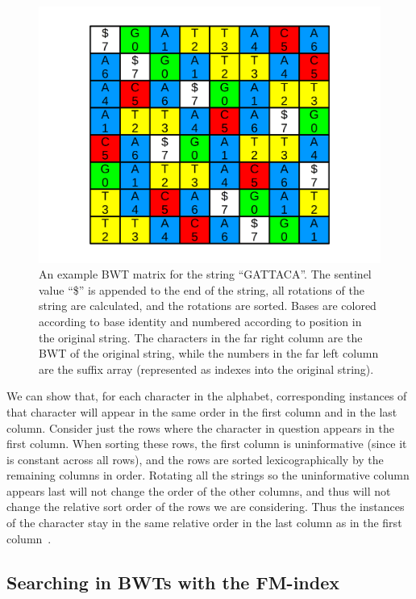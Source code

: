 \begin{figure}[ht]
    \centering
    \includegraphics[width=1.0\textwidth]{figures/01_introduction/bwt.png}
    \caption[An example BWT matrix for the string ``GATTACA'']{An example BWT matrix for the string ``GATTACA''. The sentinel value ``\$'' is appended to the end of the string, all rotations of the string are calculated, and the rotations are sorted. Bases are colored according to base identity and numbered according to position in the original string. The characters in the far right column are the BWT of the original string, while the numbers in the far left column are the suffix array (represented as indexes into the original string).}
    \label{fig:bwt}
\end{figure}

We can show that, for each character in the alphabet, corresponding instances of that character will appear in the same order in the first column and in the last column. Consider just the rows where the character in question appears in the first column. When sorting these rows, the first column is uninformative (since it is constant across all rows), and the rows are sorted lexicographically by the remaining columns in order. Rotating all the strings so the uninformative column appears last will not change the order of the other columns, and thus will not change the relative sort order of the rows we are considering. Thus the instances of the character stay in the same relative order in the last column as in the first column~\cite{langmead2013introduction}.
    
\subsection{Searching in BWTs with the FM-index}

